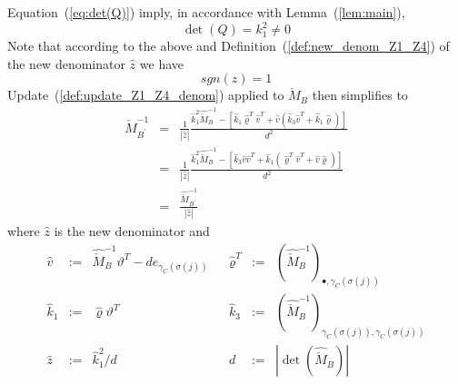 \documentclass[a4paper]{article}
\begin{document}
Equation~(\ref{eq:det(Q)}) imply, in accordance with Lemma~(\ref{lem:main}),  
\begin{equation}
\det(Q)=k_{1}^{2} \neq 0
\end{equation}
Note that according to the above and
Definition~(\ref{def:new_denom_Z1_Z4}) of the new denominator
$\hat{z}$ we have
\begin{equation}
sgn(\hat{z}) = 1
\end{equation}  
Update~(\ref{def:update_Z1_Z4_denom})
applied to $\check{M}_{B}$ then simplifies to
\begin{eqnarray}
\label{def:update_Z4}
\check{M}_{B^{\prime}}^{-1}
&=&
\frac{1}{\left|\hat{z}\right|}
\frac{
\hat{k}_{1}^{2}\hat{\check{M}}_{B}^{-1}
-\left[
  \hat{k}_{1}\hat{\varrho}^{T}\hat{v}^{T}
  +\hat{v}\left(\hat{k}_{3}\hat{v}^{T}+\hat{k}_{1}\hat{\varrho}\right)  
 \right]
}{d^{2}}
\nonumber \\
&=&
\frac{1}{\left|\hat{z}\right|}
\frac{
\hat{k}_{1}^{2}\hat{\check{M}}_{B}^{-1}
-\left[
  \hat{k}_{3}\hat{v}\hat{v}^{T}
  +\hat{k}_{1}\left(\hat{\varrho}^{T}\hat{v}^{T}+\hat{v}\hat{\varrho}\right)  
 \right]
}{d^{2}}
\nonumber \\
&=&
\frac{\hat{\check{M}}_{B^{\prime}}^{-1}}{\left|\hat{z}\right|}
\end{eqnarray}
where $\hat{z}$ is the new denominator and
\begin{equation}
\label{def:update_Z4_entities}
\begin{array}{rclcrcl}
\hat{v}
&:=&
\hat{\check{M}}_{B}^{-1}\vartheta^{T} -de_{\gamma_{C}(\sigma(j))}
&&
\hat{\varrho}^{T}
&:=&
\left(\hat{\check{M}}_{B}^{-1}\right)_{\bullet, \gamma_{C}(\sigma(j))}
\\
\hat{k}_{1}
&:=&
\hat{\varrho}\vartheta^{T}
&&
\hat{k}_{3}
&:=&
\left(\hat{\check{M}}_{B}^{-1}\right)_{\gamma_{C}(\sigma(j)),
  \gamma_{C}(\sigma(j))}
\\
\hat{z}
&:=&
\hat{k}_{1}^{2}/d
&&
d
&:=&
\left|\det(\hat{\check{M}}_{B})\right|
\end{array}
\end{equation}
\end{document}
